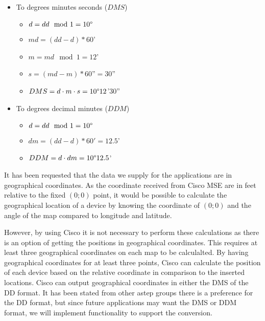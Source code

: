 \begin{itemize}
\begin{itemize}
		\item To degrees minutes seconds ($DMS$)
		\begin{itemize}
			\setlength\itemsep{0.00005em}
			\item $ d = dd \mod 1 = 10\degree $
			\item $ md = (dd - d) * 60$' 
			\item $ m = md \mod 1 = 12$' 
			\item $ s = (md - m) * 60$''$ = 30$''
			\item $ DMS = d \cdot m \cdot s = 10\degree 12$'$ 30$'' 
		\end{itemize}
		\item To degrees decimal minutes ($DDM$)
		\begin{itemize}
			\setlength\itemsep{0.00005em}
			\item $ d = dd \mod 1 = 10\degree $
			\item $ dm = (dd - d) * 60' = 12.5$'
			\item $ DDM = d \cdot dm = 10\degree 12.5$'
		\end{itemize}
	\end{itemize}
\end{itemize}

It has been requested that the data we supply for the applications are in geographical coordinates.
As the coordinate received from Cisco MSE are in feet relative to the fixed $(0;0)$ point, it would be possible to calculate the geographical location of a device by knowing the coordinate of $(0;0)$ and the angle of the map compared to longitude and latitude. 

However, by using Cisco it is not necessary to perform these calculations as there is an option of getting the positions in geographical coordinates. This requires at least three geographical coordinates on each map to be calculalted. By having geographical coordinates for at least three points, Cisco can calculate the position of each device based on the relative coordinate in comparison to the inserted locations\cite{geo_cisco}. 
Cisco can output geographical coordinates in either the DMS of the DD format\cite{cisco_geo_type}. It has been stated from other astep groups there is a preference for the DD format, but since future applications may want the DMS or DDM format, we will implement functionality to support the conversion. 

